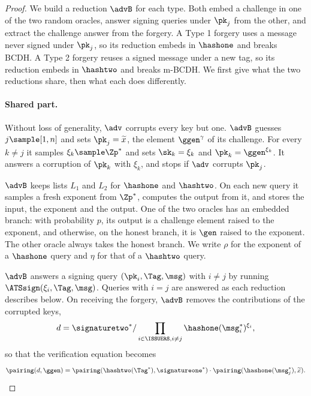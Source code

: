 \begin{proof}

  We build a reduction $\advB$ for each type. Both embed a challenge in one of
the two random oracles, answer signing queries under $\pk_j$ from the other, and
extract the challenge answer from the forgery. A Type 1 forgery uses a message
never signed under $\pk_j$, so its reduction embeds in $\hashone$ and breaks
BCDH. A Type 2 forgery reuses a signed message under a new tag, so its reduction
embeds in $\hashtwo$ and breaks m-BCDH. We first give what the two reductions
share, then what each does differently.

  \paragraph{Shared part.} Without loss of generality, $\adv$ corrupts every key
but one. $\advB$ guesses $j \sample [1,n]$ and sets $\pk_j = \widetilde{x}$, the
element $\ggen^\gamma$ of its challenge. For every $k \neq j$ it samples $\xi_k
\sample \Zp^*$ and sets $\sk_k = \xi_k$ and $\pk_k = \ggen^{\xi_k}$. It answers a
corruption of $\pk_k$ with $\xi_k$, and stops if $\adv$ corrupts $\pk_j$.

  $\advB$ keeps lists $L_1$ and $L_2$ for $\hashone$ and $\hashtwo$. On each new
query it samples a fresh exponent from $\Zp^*$, computes the output from it, and
stores the input, the exponent and the output. One of the two oracles has an
embedded branch: with probability $p$, its output is a challenge element raised
to the exponent, and otherwise, on the honest branch, it is $\gen$ raised to the
exponent. The other oracle always takes the honest branch. We write $\rho$ for the
exponent of a $\hashone$ query and $\eta$ for that of a $\hashtwo$ query.

  $\advB$ answers a signing query $(\pk_i, \Tag, \msg)$ with $i \neq j$ by running
$\ATSsign(\xi_i, \Tag, \msg)$. Queries with $i = j$ are answered as each
reduction describes below. On receiving the forgery, $\advB$ removes the
contributions of the corrupted keys,
%
\begin{equation*}
  d = \signaturetwo^* / \prod_{i \in \ISSUERS, i \neq j}\hashone(\msg^*_i)^{\xi_i},
\end{equation*}
%
so that the verification equation becomes
%
\begin{equation*}
  \pairing(d, \ggen) = \pairing(\hashtwo(\Tag^*), \signatureone^*) \cdot
\pairing(\hashone(\msg^*_j), \widetilde{x}).
\end{equation*}


\end{proof}
